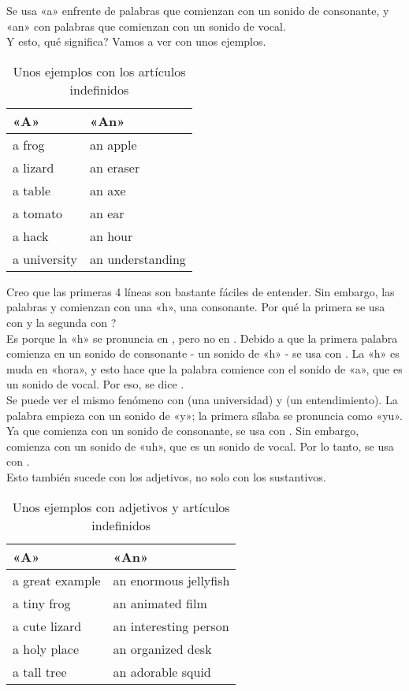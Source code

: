 Se usa «a» enfrente de palabras que comienzan con un sonido de consonante,
y «an» con palabras que comienzan con un sonido de vocal.\\

Y esto, \textquestiondown qu\'e significa? Vamos a ver con unos ejemplos.

\begin{table}[H]
	\centering
	\begin{tabular}{ll}
	\toprule
	\textbf{«A»} & \textbf{«An»} \\
	\midrule
	a frog & an apple \\
	a lizard & an eraser \\
	a table & an axe \\
	a tomato & an ear \\
	a hack & an hour \\
	a university & an understanding \\
	\bottomrule
	\end{tabular}
	\caption{Unos ejemplos con los art\'iculos indefinidos}
\end{table}

Creo que las primeras 4 l\'ineas son bastante f\'aciles de entender.
Sin embargo, las palabras  y  comienzan con una «h», una
consonante. \textquestiondown Por qu\'e la primera se usa con 
y la segunda con ? \\

Es porque la «h» se pronuncia en , pero no en .
Debido a que la primera palabra comienza en un sonido de consonante - un
sonido de «h» - se usa con . La «h» es muda en «hora», y esto
hace que la palabra comience con el sonido de «a», que es un sonido de vocal.
Por eso, se dice .\\

Se puede ver el mismo fen\'omeno con  (una universidad) y
 (un entendimiento). La palabra  empieza
con un sonido de «y»; la primera s\'ilaba se pronuncia como «yu». Ya que
comienza con un sonido de consonante, se usa con . Sin embargo,
 comienza con un sonido de «uh», que es un sonido de vocal.
Por lo tanto, se usa con .\\

Esto tambi\'en sucede con los adjetivos, no solo con los sustantivos.

\begin{table}[H]
	\centering
	\begin{tabular}{ll}
	\toprule
	\textbf{«A»} & \textbf{«An»} \\
	\midrule
	a great example & an enormous jellyfish \\
	a tiny frog & an animated film \\
	a cute lizard & an interesting person \\
	a holy place & an organized desk\\
	a tall tree & an adorable squid \\
	\bottomrule
	\end{tabular}
	\caption{Unos ejemplos con adjetivos y art\'iculos indefinidos}
\end{table}

